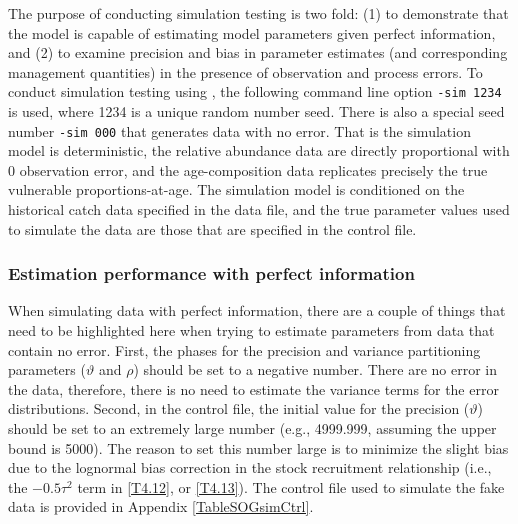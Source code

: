 		The purpose of conducting simulation testing is two fold: (1) to demonstrate that the model is capable of estimating model parameters given perfect information, and (2) to examine precision and bias in parameter estimates (and corresponding management quantities) in the presence of observation and process errors.  To conduct simulation testing using \iscam, the following command line option \verb"-sim 1234" is used, where 1234 is a unique random number seed.  There is also a special seed number \verb"-sim 000" that generates data with no error.  That is the simulation model is deterministic, the relative abundance data are directly proportional with 0 observation error, and the age-composition data replicates precisely the true vulnerable proportions-at-age.  The simulation model is conditioned on the historical catch data specified in the data file, and the true parameter values used to simulate the data are those that are specified in the control file.

	
		\subsubsection{Estimation performance with perfect information}
		 
When simulating data with perfect information, there are a couple of things that need to be highlighted here when trying to estimate parameters from data that contain no error.  First, the phases for the precision and variance partitioning parameters ($\vartheta$ and $\rho$) should be set to a negative number.  There are no error in the data, therefore, there is no need to estimate the variance terms for the error distributions.  Second, in the control file, the initial value for the precision ($\vartheta$) should be set to an extremely large number (e.g., 4999.999, assuming the upper bound is 5000).  The reason to set this number large is to minimize the slight bias due to the lognormal bias correction in the stock recruitment relationship (i.e., the $-0.5\tau^2$ term in \ref{T4.12}, or \ref{T4.13}). The control file used to simulate the fake data is provided in Appendix \ref{TableSOGsimCtrl}.




		
